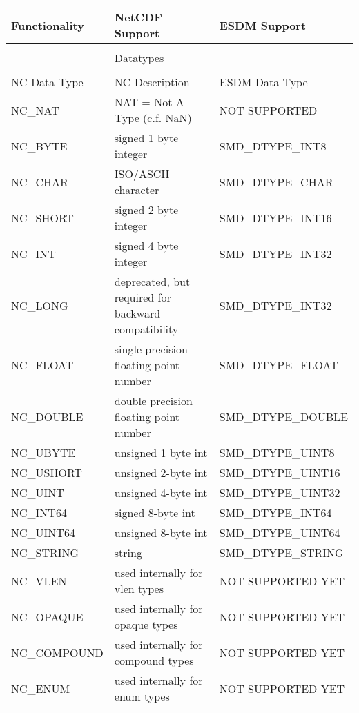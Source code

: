 \begin{table}[H]
\centering
\begin{tabular}{|l|l|l|}
\hline
Functionality & NetCDF Support & ESDM Support \\ \hline \hline

& & \\
& \large{Datatypes} & \\
& & \\ \hline \hline

NC Data Type  &  NC Description  & ESDM Data Type  \\ \hline

NC\_NAT & NAT = Not A Type (c.f. NaN) &     NOT SUPPORTED        \\ \hline
NC\_BYTE & signed 1 byte integer &     SMD\_DTYPE\_INT8        \\ \hline
NC\_CHAR & ISO/ASCII character &      SMD\_DTYPE\_CHAR       \\ \hline
NC\_SHORT & signed 2 byte integer &   SMD\_DTYPE\_INT16          \\ \hline
NC\_INT & signed 4 byte integer &     SMD\_DTYPE\_INT32        \\ \hline
NC\_LONG & deprecated, but required for backward compatibility &    SMD\_DTYPE\_INT32         \\ \hline
NC\_FLOAT & single precision floating point number &   SMD\_DTYPE\_FLOAT           \\ \hline
NC\_DOUBLE & double precision floating point number &   SMD\_DTYPE\_DOUBLE          \\ \hline
NC\_UBYTE & unsigned 1 byte int &     SMD\_DTYPE\_UINT8        \\ \hline
NC\_USHORT & unsigned 2-byte int &    SMD\_DTYPE\_UINT16         \\ \hline
NC\_UINT & unsigned 4-byte int &   SMD\_DTYPE\_UINT32          \\ \hline
NC\_INT64 & signed 8-byte int &    SMD\_DTYPE\_INT64         \\ \hline
NC\_UINT64 & unsigned 8-byte int &    SMD\_DTYPE\_UINT64         \\ \hline
NC\_STRING & string &    SMD\_DTYPE\_STRING         \\ \hline
NC\_VLEN & used internally for vlen types &      NOT SUPPORTED YET       \\ \hline
NC\_OPAQUE & used internally for opaque types &     NOT SUPPORTED YET        \\ \hline
NC\_COMPOUND & used internally for compound types &    NOT SUPPORTED YET         \\ \hline
NC\_ENUM & used internally for enum types &       NOT SUPPORTED YET      \\ \hline \hline


\end{tabular}
\end{table}
